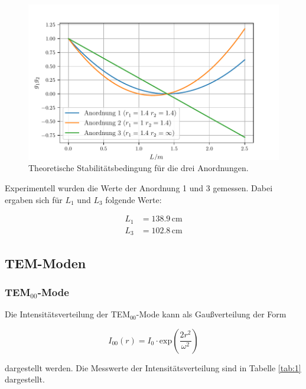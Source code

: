   \begin{figure}
    \centering
    \includegraphics[width=\textwidth]{Anordnungen_Theorie.pdf}
    \caption{Theoretische Stabilitätsbedingung für die drei Anordnungen.}
    \label{Abb:1}
  \end{figure}

  Experimentell wurden die Werte der Anordnung 1 und 3 gemessen. Dabei ergaben
  sich für $L_1$ und $L_3$ folgende Werte:

  \begin{align}
    L_1 &= 138.9\,\text{cm} \\
    L_3 &= 102.8\,\text{cm}
  \end{align}

\subsection{TEM-Moden}
  \subsubsection{TEM$_{00}$-Mode}
    Die Intensitätsverteilung der TEM$_{00}$-Mode kann als Gaußverteilung der
    Form

    \begin{equation}
      I_{00}(r) = I_0 \cdot \text{exp} \left(\frac{2 r^2}{\omega^2} \right)
      \label{Eqn:3}
    \end{equation}

    dargestellt werden. Die Messwerte der Intensitätsverteilung sind in Tabelle \ref{tab:1}
    dargestellt.

    
